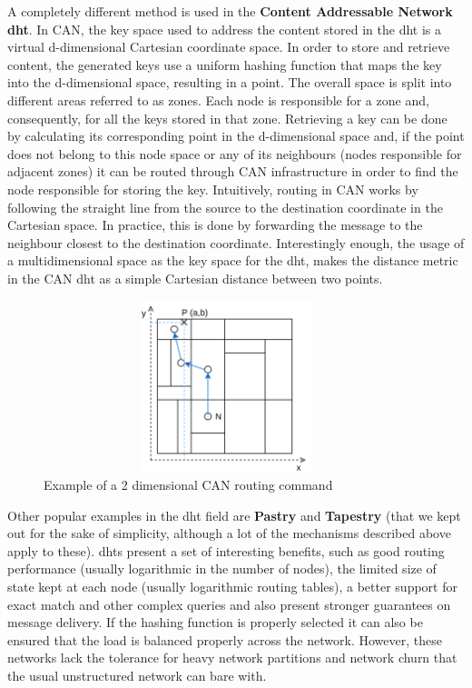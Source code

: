 A completely different method is used in the \textbf{Content Addressable
Network \acrshort{dht}}\cite{Ratnasamy2001a}. In CAN, the key space used to
address the content stored in the \acrshort{dht} is a virtual d-dimensional
Cartesian coordinate space. In order to store and retrieve content, the
generated keys use a uniform hashing function that maps the key into the
d-dimensional space, resulting in a point. The overall space is split
into different areas referred to as zones. Each node is responsible for
a zone and, consequently, for all the keys stored in that zone.
Retrieving a key can be done by calculating its corresponding point in
the d-dimensional space and, if the point does not belong to this node
space or any of its neighbours (nodes responsible for adjacent zones) it
can be routed through CAN infrastructure in order to find the node
responsible for storing the key. Intuitively, routing in CAN works by
following the straight line from the source to the destination
coordinate in the Cartesian space. In practice, this is done by
forwarding the message to the neighbour closest to the destination
coordinate. Interestingly enough, the usage of a multidimensional space
as the key space for the \acrshort{dht}, makes the distance metric in the CAN \acrshort{dht}
as a simple Cartesian distance between two points.

\begin{figure}[hb!]
  \centering
  \includegraphics[max height=5cm,max width=0.95\textwidth]{../images/can.png}
  \caption{Example of a 2 dimensional CAN routing command}
  \label{fig:can}
\end{figure}

Other popular examples in the \acrshort{dht} field are \textbf{Pastry} \cite{Rowstron2001} and
\textbf{Tapestry} \cite{Zhao2006} (that we kept out for the sake of simplicity, although
a lot of the mechanisms described above apply to these). \acrshort{dht}s present a
set of interesting benefits, such as good routing performance (usually
logarithmic in the number of nodes), the limited size of state kept at
each node (usually logarithmic routing tables), a better support for
exact match and other complex queries and also present stronger
guarantees on message delivery. If the hashing function is properly
selected it can also be ensured that the load is balanced properly
across the network. However, these networks lack the tolerance for heavy
network partitions and network churn that the usual unstructured network
can bare with.
\bigskip

